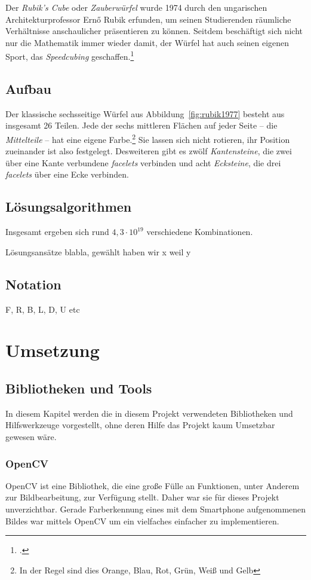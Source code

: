 Der \emph{Rubik's Cube} oder \emph{Zauberwürfel} wurde 1974 durch den
ungarischen Architekturprofessor Ernő Rubik erfunden, um seinen Studierenden
räumliche Verhältnisse anschaulicher präsentieren zu können. Seitdem beschäftigt
sich nicht nur die Mathematik immer wieder damit, der Würfel hat auch seinen
eigenen Sport, das \emph{Speedcubing} geschaffen.\footcite{rubik:history} 

\subsection{Aufbau}  %

Der klassische sechsseitige Würfel aus Abbildung~\ref{fig:rubik1977} besteht aus
insgesamt 26 Teilen. Jede der sechs mittleren Flächen auf jeder Seite – die
\emph{Mittelteile} – hat eine eigene Farbe.\footnote{In der Regel sind dies
Orange, Blau, Rot, Grün, Weiß und Gelb} Sie lassen sich nicht rotieren, ihr
Position zueinander ist also festgelegt. Desweiteren gibt es zwölf
\emph{Kantensteine}, die zwei über eine Kante verbundene \emph{facelets}
verbinden und acht \emph{Ecksteine}, die drei \emph{facelets} über eine Ecke
verbinden.

\subsection{Lösungsalgorithmen}  %

Insgesamt ergeben sich rund \( 4,3 \cdot {10}^{19} \) verschiedene
Kombinationen.

Lösungsansätze blabla, gewählt haben wir x weil y

\subsection{Notation}  %

F, R, B, L, D, U etc


\section{Umsetzung}  %

\subsection{Bibliotheken und Tools}  %
In diesem Kapitel werden die in diesem Projekt verwendeten Bibliotheken und Hilfswerkzeuge
vorgestellt, ohne deren Hilfe das Projekt kaum Umsetzbar gewesen wäre.
\subsubsection{OpenCV}  %
OpenCV ist eine Bibliothek, die eine große Fülle an Funktionen, unter Anderem zur Bildbearbeitung, zur Verfügung stellt.
Daher war sie für dieses Projekt unverzichtbar. Gerade Farberkennung eines mit dem Smartphone aufgenommenen Bildes
war mittels OpenCV um ein vielfaches einfacher zu implementieren.
